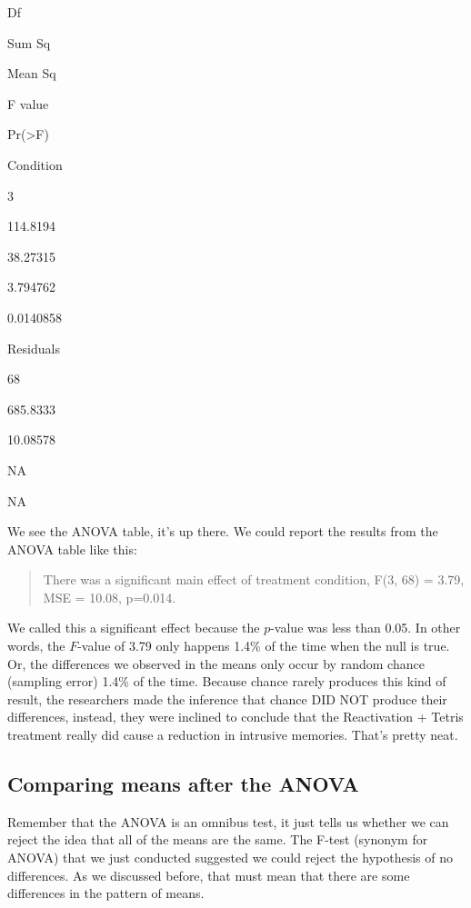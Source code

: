 \documentclass[]{book}
\begin{document}
Df

Sum Sq

Mean Sq

F value

Pr(\textgreater{}F)

Condition

3

114.8194

38.27315

3.794762

0.0140858

Residuals

68

685.8333

10.08578

NA

NA

We see the ANOVA table, it's up there. We could report the results from the ANOVA table like this:

\begin{quote}
There was a significant main effect of treatment condition, F(3, 68) = 3.79, MSE = 10.08, p=0.014.
\end{quote}

We called this a significant effect because the \(p\)-value was less than 0.05. In other words, the \(F\)-value of 3.79 only happens 1.4\% of the time when the null is true. Or, the differences we observed in the means only occur by random chance (sampling error) 1.4\% of the time. Because chance rarely produces this kind of result, the researchers made the inference that chance DID NOT produce their differences, instead, they were inclined to conclude that the Reactivation + Tetris treatment really did cause a reduction in intrusive memories. That's pretty neat.

\hypertarget{comparing-means-after-the-anova}{%
\subsection{Comparing means after the ANOVA}\label{comparing-means-after-the-anova}}

Remember that the ANOVA is an omnibus test, it just tells us whether we can reject the idea that all of the means are the same. The F-test (synonym for ANOVA) that we just conducted suggested we could reject the hypothesis of no differences. As we discussed before, that must mean that there are some differences in the pattern of means.
\end{document}
